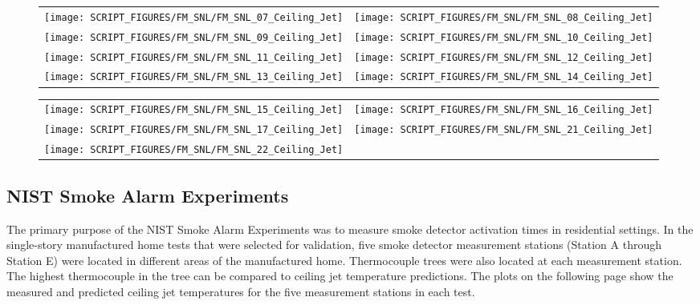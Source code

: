 \begin{figure}[p]
\begin{tabular*}{\textwidth}{l@{\extracolsep{\fill}}r}
\texttt{[image: SCRIPT\_FIGURES/FM\_SNL/FM\_SNL\_07\_Ceiling\_Jet]} &
\texttt{[image: SCRIPT\_FIGURES/FM\_SNL/FM\_SNL\_08\_Ceiling\_Jet]} \\
\texttt{[image: SCRIPT\_FIGURES/FM\_SNL/FM\_SNL\_09\_Ceiling\_Jet]} &
\texttt{[image: SCRIPT\_FIGURES/FM\_SNL/FM\_SNL\_10\_Ceiling\_Jet]} \\
\texttt{[image: SCRIPT\_FIGURES/FM\_SNL/FM\_SNL\_11\_Ceiling\_Jet]} &
\texttt{[image: SCRIPT\_FIGURES/FM\_SNL/FM\_SNL\_12\_Ceiling\_Jet]} \\
\texttt{[image: SCRIPT\_FIGURES/FM\_SNL/FM\_SNL\_13\_Ceiling\_Jet]} &
\texttt{[image: SCRIPT\_FIGURES/FM\_SNL/FM\_SNL\_14\_Ceiling\_Jet]} \\
\end{tabular*}
\label{FM_SNL_Ceiling_Jet_2}
\end{figure}

\begin{figure}[p]
\begin{tabular*}{\textwidth}{l@{\extracolsep{\fill}}r}
\texttt{[image: SCRIPT\_FIGURES/FM\_SNL/FM\_SNL\_15\_Ceiling\_Jet]} &
\texttt{[image: SCRIPT\_FIGURES/FM\_SNL/FM\_SNL\_16\_Ceiling\_Jet]} \\
\texttt{[image: SCRIPT\_FIGURES/FM\_SNL/FM\_SNL\_17\_Ceiling\_Jet]} &
\texttt{[image: SCRIPT\_FIGURES/FM\_SNL/FM\_SNL\_21\_Ceiling\_Jet]} \\
\texttt{[image: SCRIPT\_FIGURES/FM\_SNL/FM\_SNL\_22\_Ceiling\_Jet]} \\
\end{tabular*}
\label{FM_SNL_Ceiling_Jet_3}
\end{figure}


\clearpage

\subsection{NIST Smoke Alarm Experiments}

The primary purpose of the NIST Smoke Alarm Experiments was to measure smoke detector activation times in residential settings. In the single-story manufactured home tests that were selected for validation, five smoke detector measurement stations (Station A through Station E) were located in different areas of the manufactured home. Thermocouple trees were also located at each measurement station. The highest thermocouple in the tree can be compared to ceiling jet temperature predictions. The plots on the following page show the measured and predicted ceiling jet temperatures for the five measurement stations in each test.

